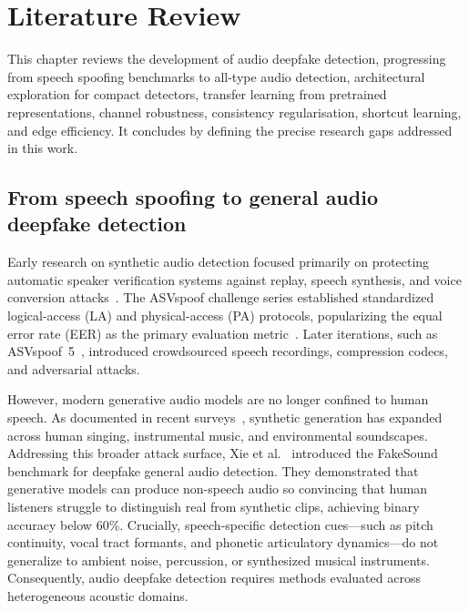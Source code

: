 \chapter{Literature Review}
\label{ch:literature}

This chapter reviews the development of audio deepfake detection, progressing from speech spoofing benchmarks to all-type audio detection, architectural exploration for compact detectors, transfer learning from pretrained representations, channel robustness, consistency regularisation, shortcut learning, and edge efficiency. It concludes by defining the precise research gaps addressed in this work.

\section{From speech spoofing to general audio deepfake detection}

Early research on synthetic audio detection focused primarily on protecting automatic speaker verification systems against replay, speech synthesis, and voice conversion attacks~\cite{kinnunen2017detection,wang2020asvspoof}. The ASVspoof challenge series established standardized logical-access (LA) and physical-access (PA) protocols, popularizing the equal error rate (EER) as the primary evaluation metric~\cite{wang2020asvspoof}. Later iterations, such as ASVspoof~5~\cite{wang2025asvspoof5}, introduced crowdsourced speech recordings, compression codecs, and adversarial attacks.

However, modern generative audio models are no longer confined to human speech. As documented in recent surveys~\cite{shaaban2023ieeeAccess,zhang2025sensorsSurvey,alnaqbi2026systematic,nguyenle2026deepfakeSurvey}, synthetic generation has expanded across human singing, instrumental music, and environmental soundscapes. Addressing this broader attack surface, Xie et al.~\cite{xie2024fakesound} introduced the FakeSound benchmark for deepfake general audio detection. They demonstrated that generative models can produce non-speech audio so convincing that human listeners struggle to distinguish real from synthetic clips, achieving binary accuracy below 60\%. Crucially, speech-specific detection cues---such as pitch continuity, vocal tract formants, and phonetic articulatory dynamics---do not generalize to ambient noise, percussion, or synthesized musical instruments. Consequently, audio deepfake detection requires methods evaluated across heterogeneous acoustic domains.

